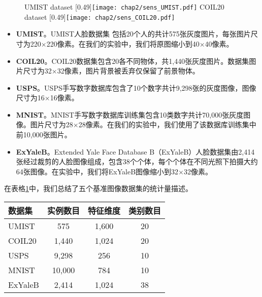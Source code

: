 \begin{figure}[t]
	\centering
					{UMIST dataset}
					[0.49\textwidth]{\texttt{[image: chap2/sens\_UMIST.pdf]}}
					{COIL20 dataset}
					[0.49\textwidth]{\texttt{[image: chap2/sens\_COIL20.pdf]}}
	\label{fig2:Sen}
\end{figure} 

\begin{itemize}
	\item {\textbf{UMIST}}。UMIST人脸数据集 \cite{graham1998characterising}包括20个人的共计575张灰度图片，每张图片尺寸为220$ \times $220像素。在我们的实验中，我们将原图缩小到40$ \times $40像素。
	\item {\textbf{COIL20}}。COIL20数据集\cite{nene1996columbia}包含20各不同物体，共1,440张灰度图片。数据集图片尺寸为32$\times$32像素，图片背景被丢弃仅保留了前景物体。
	\item {\textbf{USPS}}。USPS手写数字数据库\cite{hull1994database}包含了10个数字共计9,298张的灰度图像，图像尺寸为16$\times$16像素。
	\item {\textbf{MNIST}}。MNIST手写数字数据库\cite{lecun1998gradient}训练集包含10类数字共计70,000张灰度图像。图片尺寸为28$\times$28像素。在我们的实验中，我们使用了该数据库训练集中前10,000张图片。
	\item {\textbf{ExYaleB}}。Extended Yale Face Database B（ExYaleB）人脸数据集\cite{KCLee05}由2,414张经过裁剪的人脸图像组成，包含38个个体，每个个体在不同光照下拍摄大约64张图像。在实验中，我们将ExYaleB图像缩小到32$ \times $32像素。
\end{itemize}

在表格\ref{tab2:Data}中，我们总结了五个基准图像数据集的统计量描述。

\begin{table}[t]
	\label{tab2:Data}
	\centering
	\begin{tabular}{l c c c}
		\toprule
		数据集 & 实例数目 & 特征维度 & 类别数目\\ 
		\midrule
		UMIST & 575 & 1,600 & 20\\
		COIL20 & 1,440 & 1,024 & 20\\
		USPS & 9,298 & 256 & 10\\
		MNIST & 10,000 & 784 & 10\\
		ExYaleB & 2,414 & 1,024 & 38\\
		\bottomrule
	\end{tabular}
\end{table}


